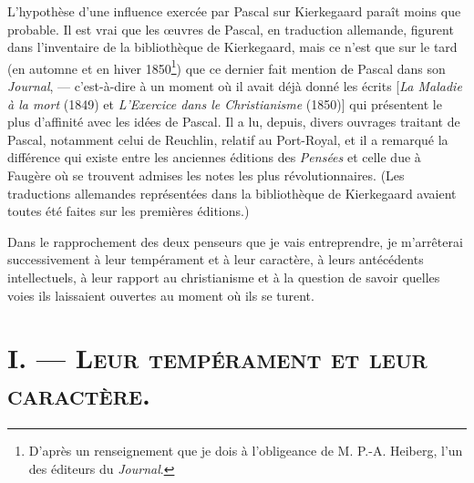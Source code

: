 \documentclass[12pt,a4paper]{article}
\newcommand{\opage}[1]{\marginnote{\footnotesize\textit{[#1]}}}
\begin{document}
L'hypothèse d'une influence exercée par Pascal sur Kierkegaard
paraît moins que probable. Il est vrai que les œuvres de Pascal,
en traduction allemande, figurent dans l'inventaire de la bibliothèque
de Kierkegaard, mais ce n'est que sur le tard (en automne et
en hiver 1850\footnote{D'après un renseignement que je dois à l'obligeance de M. P.-A. Heiberg,
l'un des éditeurs du \emph{Journal}.}) que ce dernier fait mention de Pascal dans son
\emph{Journal}, --- c'est-à-dire à un moment où il avait déjà donné les
écrits [\emph{La Maladie à la mort} (1849) et \emph{L'Exercice dans le Christianisme}
(1850)] qui présentent le plus d'affinité avec les idées de
Pascal. Il a lu, depuis, divers ouvrages traitant de Pascal, notamment
celui de Reuchlin, relatif au Port-Royal, et il a remarqué la
différence qui existe entre les anciennes éditions des \emph{Pensées} et
celle due à Faugère où se trouvent admises les notes les plus révolutionnaires.
(Les traductions allemandes représentées dans la
bibliothèque de Kierkegaard avaient toutes été faites sur les premières
éditions.)

Dans le rapprochement des deux penseurs que je vais entreprendre,
je m'arrêterai successivement à leur tempérament et à leur
caractère, à leurs antécédents intellectuels, à leur rapport au christianisme
et à la question de savoir quelles voies ils laissaient
ouvertes au moment où ils se turent.
\opage{225} %
\section*{I. --- \textsc{Leur tempérament et leur caractère.}}
\end{document}
